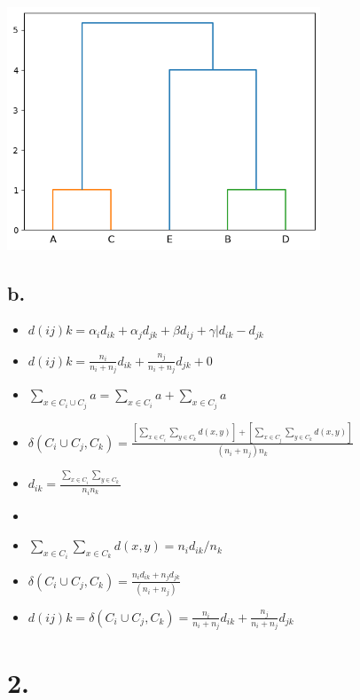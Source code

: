 \documentclass[11pt]{article}
\begin{document}
\begin{center}
\includegraphics[width=0.7\textwidth]{./.ob-jupyter/3a11fd48cbe6a3069ecc828cee581839012b140d.png}
\end{center}

\subsection*{b.}
\label{sec:org7d1c34b}

\begin{itemize}
\item \(d(ij)k = \alpha_id_{ik} + \alpha_jd_{jk} + \beta d_{ij} + \gamma|d_{ik} - d_{jk}\)
\item \(d(ij)k = \frac{n_i}{n_i + n_j} d_{ik} + \frac{n_j}{n_i + n_j} d_{jk} + 0\)
\item \(\sum_{x \in C_i \cup C_j}a = \sum_{x \in C_i}a + \sum_{x \in C_j}a\)
\item \(\delta(C_i\cup C_j, C_k) = \frac{\left[\sum \limits_{x \in C_i} \sum \limits_{y \in C_k} d(x, y)\right] +
  \left[\sum \limits_{x \in C_j} \sum \limits_{y \in C_k} d(x, y)\right]}{(n_i + n_j)n_k}\)
\item \(d_{ik} = \frac{\sum_{x \in C_i}\sum_{y \in C_k}}{n_in_k}\)
\item 

\item \(\sum _{x \in C_i} \sum _{x \in C_k} d(x, y) = n_id_{ik}/n_k\)
\item \(\delta(C_i \cup C_j, C_k) = \frac{n_id_{ik} + n_jd_{jk}}{(n_i + n_j)}\)
\item \(d(ij)k = \delta(C_i \cup C_j, C_k) =  \frac{n_i}{n_i + n_j} d_{ik} + \frac{n_j}{n_i + n_j} d_{jk}\)
\end{itemize}
\section*{2.}
\label{sec:org5223179}
\end{document}
